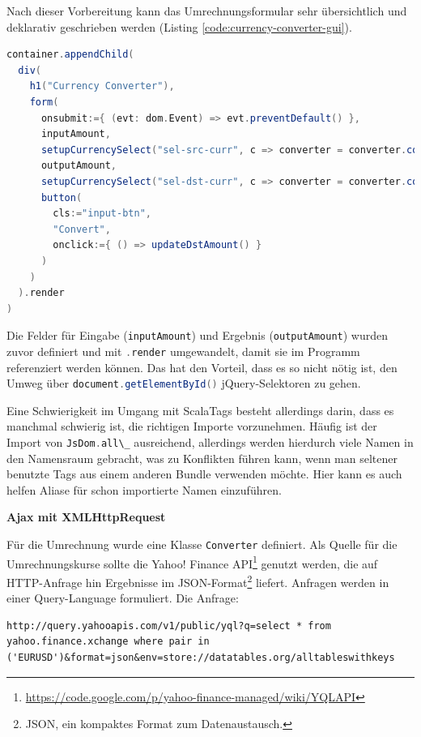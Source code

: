 \documentclass[a4paper, 12pt, hidelinks, listof=totoc, listoftables=totoc, bibliography=totoc]{scrreprt}
\newcommand{\scala}[1]{\lstinline[language=Scala, style=inline]|#1|}
\newcommand{\MyMiniSec}[1]{\rmfamily\fontsize{12}{15}\selectfont
	\vspace{7pt}\textbf{#1} %
}
\begin{document}
Nach dieser Vorbereitung kann das Umrechnungsformular sehr übersichtlich und deklarativ geschrieben werden (Listing \ref{code:currency-converter-gui}).

\begin{lstlisting}[language=Scala, caption={Deklaration eines Formulars zur Währungsumrechnung mit ScalaTags.}, label={code:currency-converter-gui}]
container.appendChild(
  div(
    h1("Currency Converter"),
    form(
      onsubmit:={ (evt: dom.Event) => evt.preventDefault() },
      inputAmount,
      setupCurrencySelect("sel-src-curr", c => converter = converter.copy(srcCurr = c)),
      outputAmount,
      setupCurrencySelect("sel-dst-curr", c => converter = converter.copy(dstCurr = c)),
      button(
        cls:="input-btn",
        "Convert",
        onclick:={ () => updateDstAmount() }
      )
    )
  ).render
)
\end{lstlisting}

Die Felder für Eingabe (\scala{inputAmount}) und Ergebnis (\scala{outputAmount}) wurden zuvor definiert und mit \scala{.render} umgewandelt, damit sie im Programm referenziert werden können. Das hat den Vorteil, dass es so nicht nötig ist, den Umweg über \scala{document.getElementById()} jQuery-Selektoren zu gehen.

Eine Schwierigkeit im Umgang mit ScalaTags besteht allerdings darin, dass es manchmal schwierig ist, die richtigen Importe vorzunehmen. Häufig ist der Import von \scala{JsDom.all\_} ausreichend, allerdings werden hierdurch viele Namen in den Namensraum gebracht, was zu Konflikten führen kann, wenn man seltener benutzte Tags aus einem anderen Bundle verwenden möchte. Hier kann es auch helfen Aliase für schon importierte Namen einzuführen.


\MyMiniSec{Ajax mit XMLHttpRequest}

Für die Umrechnung wurde eine Klasse \scala{Converter} definiert. Als Quelle für die Umrechnungskurse sollte die Yahoo! Finance \ac{API}\footnote{\url{https://code.google.com/p/yahoo-finance-managed/wiki/YQLAPI}} genutzt werden, die auf \ac{HTTP}-Anfrage hin Ergebnisse im JSON-Format\footnote{\ac{JSON}, ein kompaktes Format zum Datenaustausch.} liefert. Anfragen werden in einer Query-Language formuliert. Die Anfrage:

\begin{lstlisting}[aboveskip=0pt, style=snippet]
http://query.yahooapis.com/v1/public/yql?q=select * from yahoo.finance.xchange where pair in ('EURUSD')&format=json&env=store://datatables.org/alltableswithkeys
\end{lstlisting}
\end{document}
